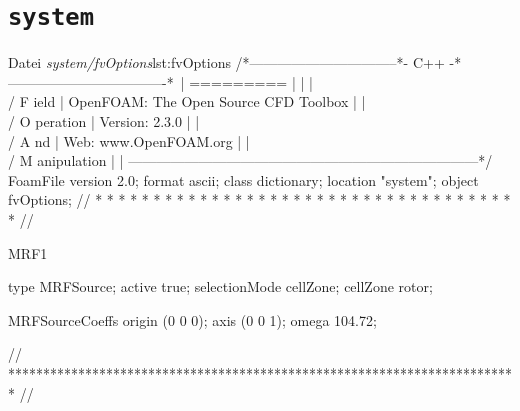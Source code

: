 \chapter{\texttt{system}}

\begin{dict}{Datei \textit{system/fvOptions}}{lst:fvOptions}
/*--------------------------------*- C++ -*----------------------------------*\
| =========                 |                                                 |
| \\      /  F ield         | OpenFOAM: The Open Source CFD Toolbox           |
|  \\    /   O peration     | Version:  2.3.0                                 |
|   \\  /    A nd           | Web:      www.OpenFOAM.org                      |
|    \\/     M anipulation  |                                                 |
\*---------------------------------------------------------------------------*/
FoamFile
{
    version     2.0;
    format      ascii;
    class       dictionary;
    location    "system";
    object      fvOptions;
}
// * * * * * * * * * * * * * * * * * * * * * * * * * * * * * * * * * * * * * //

MRF1
{
    type            MRFSource;
    active          true;
    selectionMode   cellZone;
    cellZone        rotor;

    MRFSourceCoeffs
    {
        origin      (0 0 0);
        axis        (0 0 1);
        omega       104.72;
    }
}


// ************************************************************************* //
\end{dict}

\newpage

